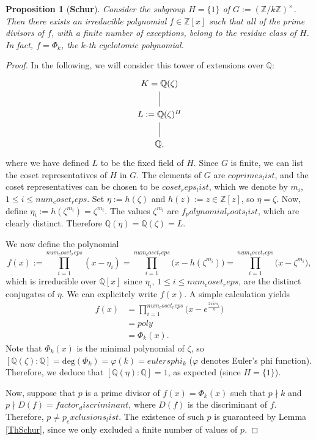 \documentclass[a4paper, 12pt]{article}
\newtheorem{proposition}[theorem]{Proposition}
\theoremstyle{definition}
\theoremstyle{remark}
\newcommand{\Z}{\ensuremath{\mathbb{Z}}}
\newcommand{\Q}{\ensuremath{\mathbb{Q}}}
\begin{document}
\begin{proposition}[\textbf{Schur}]\label{th4murty}
Consider the subgroup $H=\{1\}$ of $G:=(\Z/{k}\Z)^\times$. Then there exists an irreducible polynomial $f\in\Z[x]$ such that all of the prime divisors of $f$, with a finite number of exceptions, belong to the residue class of $H$. In fact, $f=\Phi_{{k}}$, the ${k}$-th cyclotomic polynomial.
\end{proposition}
\begin{proof}
In the following, we will consider this tower of extensions over $\Q$:
	\[
	\begin{tikzcd}	
	K=\Q(\zeta) \arrow[d, dash] \\ 
	L:=\Q(\zeta)^H \arrow[d, dash] \\ 
	\Q,
	\end{tikzcd}
	\]
\vspace{0.2cm}
where we have defined $L$ to be the fixed field of $H$. Since $G$ is finite, we can list the coset representatives of $H$ in $G$. The elements of $G$ are ${coprimes_list}$, and the coset representatives can be chosen to be ${coset_reps_list}$, which we denote by $m_i$, $1\leqslant i \leqslant {num_coset_reps}$. Set $\eta:=h(\zeta)$ and $h(z):=z\in\Z[z]$, so $\eta=\zeta$. Now, define $\eta_i:=h(\zeta^{m_i})=\zeta^{m_i}$. The values $\zeta^{m_i}$ are ${f_polynomial_roots_list}$, which are clearly distinct. Therefore $\Q(\eta)=\Q(\zeta)=L$.

We now define the polynomial
\begin{equation}\label{polinomi}
f(x):=\prod_{i=1}^{{num_coset_reps}}(x-\eta_i)=\prod_{i=1}^{{num_coset_reps}}\big(x-h(\zeta^{m_i})\big)=\prod_{i=1}^{{num_coset_reps}}\big(x-\zeta^{m_i}\big),
\end{equation}
which is irreducible over $\Q[x]$ since $\eta_i$, $1\leqslant i \leqslant {num_coset_reps}$, are the distinct conjugates of $\eta$. We can explicitely write $f(x)$. A simple calculation yields
\begin{align*}
f(x)&=\prod_{i=1}^{{num_coset_reps}}\Big(x-e^\frac{2\pi im_i}{{k}}\Big)\\
&={poly}\\
&=\Phi_{{k}}(x).
\end{align*}
Note that $\Phi_{{k}}(x)$ is the minimal polynomial of $\zeta$, so $[\Q(\zeta):\Q]=\text{deg}(\Phi_{{k}})=\varphi({k})={eulersphi_k}$ ($\varphi$ denotes Euler's phi function). Therefore, we deduce that $[\Q(\eta):\Q]=1$, as expected (since $H=\{1\}$). 
 
Now, suppose that $p$ is a prime divisor of $f(x)=\Phi_{{k}}(x)$ such that $p\nmid {k}$ and $p\nmid D(f)={factor_discriminant}$, where $D(f)$ is the discriminant of $f$. Therefore, $p\neq{p_exclusions_list}$. The existence of such $p$ is guaranteed by Lemma \ref{ThSchur}, since we only excluded a finite number of values of $p$.


\end{proof}
\end{document}
